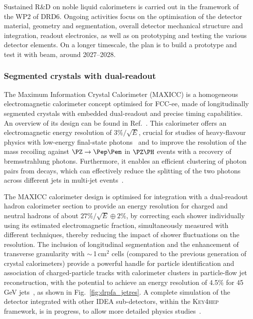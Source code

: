 Sustained R\&D on noble liquid calorimeters is carried out in the framework of the WP2 of DRD6. 
Ongoing activities focus on the optimisation of the detector material, geometry and segmentation, 
overall detector mechanical structure and integration, readout electronics, 
as well as on prototyping and testing the various detector elements. 
On a longer timescale, the plan is to build a prototype and test it with beam, around 2027--2028.

\subsubsection{Segmented crystals with dual-readout}
\label{sec:Segmented-crystals}

The Maximum Information Crystal Calorimeter (MAXICC) 
is a homogeneous electromagnetic calorimeter concept optimised for FCC-ee,
made of longitudinally segmented crystals with embedded dual-readout and precise timing capabilities. 
An overview of its design can be found in Ref.~\cite{Lucchini:2020bac}.
This calorimeter offers an electromagnetic energy resolution of $3\%/\sqrt{E}$, 
crucial for studies of heavy-flavour physics with low-energy final-state photons~\cite{RoyAleksan} 
and to improve the resolution of the mass recoiling against $\PZ \to \epem$ in $\PZ\PH$ events with a recovery of bremsstrahlung photons. 
Furthermore, it enables an efficient clustering of photon pairs from \PGpz decays, 
which can effectively reduce the splitting of the two photons across different jets in multi-jet events~\cite{Lucchini:2020bac}.

The MAXICC calorimeter design is optimised for integration with a dual-readout hadron calorimeter section 
to provide an energy resolution for charged and neutral hadrons of about $27\%/\sqrt{E} \oplus 2\%$,
by correcting each shower individually using its estimated electromagnetic fraction, 
simultaneously measured with different techniques, 
thereby reducing the impact of shower fluctuations on the resolution. 
The inclusion of longitudinal segmentation and the enhancement of transverse granularity with $\sim$\,1\,cm$^2$ cells 
(compared to the previous generation of crystal calorimeters) 
provide a powerful handle for particle identification 
and association of charged-particle tracks with calorimeter clusters in particle-flow jet reconstruction, 
with the potential to achieve an energy resolution of 4.5\% for 45\,GeV jets~\cite{Lucchini_2022}, 
as shown in Fig.~\ref{fig:drpfa_jetres}.
A complete simulation of the detector integrated with other IDEA sub-detectors,
within the \textsc{Key4hep} framework, 
is in progress, to allow more detailed physics studies~\cite{WonyongProceeding}.

